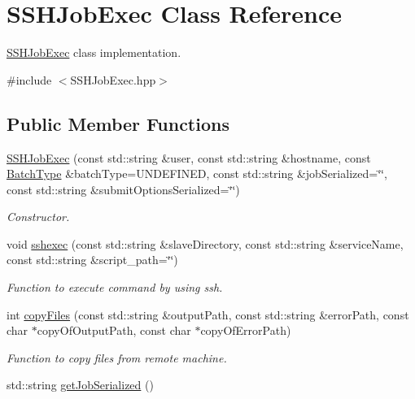 \hypertarget{classSSHJobExec}{
\section{SSHJobExec Class Reference}
\label{classSSHJobExec}
}


\hyperlink{classSSHJobExec}{SSHJobExec} class implementation.  




{\ttfamily \#include $<$SSHJobExec.hpp$>$}

\subsection*{Public Member Functions}
\begin{DoxyCompactItemize}
\item 
\hyperlink{classSSHJobExec_a5d668f7ace2d9254b2e56f6da222f1f4}{SSHJobExec} (const std::string \&user, const std::string \&hostname, const \hyperlink{utilVishnu_8hpp_a864d748e7097d176552dd4c7635016ea}{BatchType} \&batchType=UNDEFINED, const std::string \&jobSerialized=\char`\"{}\char`\"{}, const std::string \&submitOptionsSerialized=\char`\"{}\char`\"{})
\begin{DoxyCompactList}\small\item\em Constructor. \item\end{DoxyCompactList}\item 
void \hyperlink{classSSHJobExec_a8cd9b0b6bb07890bbe3d1dcacab24eb5}{sshexec} (const std::string \&slaveDirectory, const std::string \&serviceName, const std::string \&script\_\-path=\char`\"{}\char`\"{})
\begin{DoxyCompactList}\small\item\em Function to execute command by using ssh. \item\end{DoxyCompactList}\item 
int \hyperlink{classSSHJobExec_ae422bcb5022de94c945109142c5f9fdc}{copyFiles} (const std::string \&outputPath, const std::string \&errorPath, const char $\ast$copyOfOutputPath, const char $\ast$copyOfErrorPath)
\begin{DoxyCompactList}\small\item\em Function to copy files from remote machine. \item\end{DoxyCompactList}\item 
std::string \hyperlink{classSSHJobExec_a760e6236808e1ca96832aa2ed4e6c997}{getJobSerialized} ()

\end{DoxyCompactItemize}
